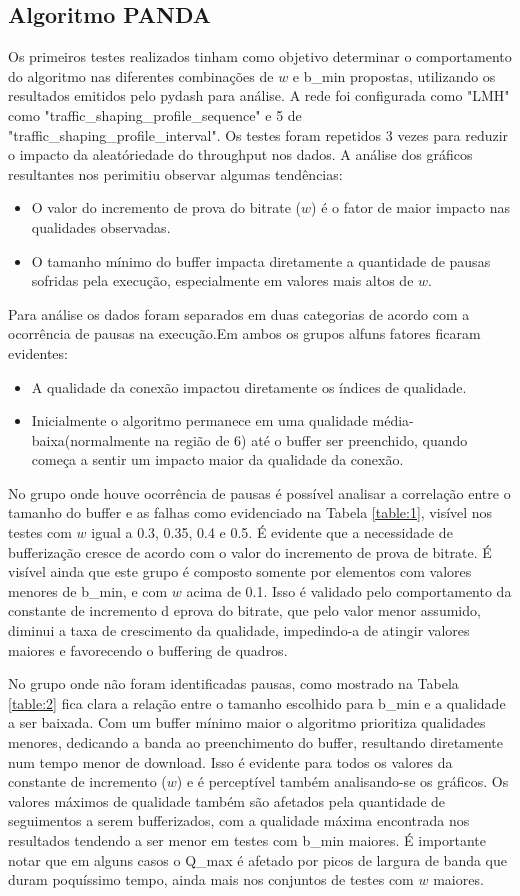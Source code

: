 \documentclass[10pt,twocolumn,letterpaper]{article}
\begin{document}
\subsection{Algoritmo PANDA}
Os primeiros testes realizados tinham como objetivo determinar o comportamento do algoritmo nas diferentes combinações de $w$ e b\_min propostas, utilizando os resultados emitidos pelo pydash para análise. A rede foi configurada como "LMH" como "traffic\_shaping\_profile\_sequence" e 5 de "traffic\_shaping\_profile\_interval". Os testes foram repetidos 3 vezes para reduzir o impacto da aleatóriedade do throughput nos dados. A análise dos gráficos resultantes nos perimitiu observar algumas tendências: 
\begin{itemize}
	\item O valor do incremento de prova do bitrate ($w$) é o fator de maior impacto nas qualidades observadas. 
	\item O tamanho mínimo do buffer impacta diretamente a quantidade de pausas sofridas pela execução, especialmente em valores mais altos de $w$.
\end{itemize}
Para análise os dados foram separados em duas categorias de acordo com a ocorrência de pausas na execução.Em ambos os grupos alfuns fatores ficaram evidentes:
\begin{itemize}
	\item A qualidade da conexão impactou diretamente os índices de qualidade.
	\item Inicialmente o algoritmo permanece em uma qualidade média-baixa(normalmente na região de 6) até o buffer ser preenchido, quando começa a sentir um impacto maior da qualidade da conexão.
\end{itemize}

No grupo onde houve ocorrência de pausas é possível analisar a correlação entre o tamanho do buffer e as falhas como evidenciado na Tabela \ref{table:1}, visível nos testes com $w$ igual a 0.3, 0.35, 0.4 e  0.5. É evidente que a necessidade de bufferização cresce de acordo com o valor do incremento de prova de bitrate. É visível ainda que este grupo é composto somente por elementos com valores menores de b\_min, e com $w$ acima de 0.1. Isso é validado pelo comportamento da  
constante de incremento d eprova do bitrate, que pelo valor menor assumido, diminui a taxa de crescimento da qualidade, impedindo-a de atingir valores maiores e favorecendo o buffering de quadros.

No grupo onde não foram identificadas pausas, como mostrado na Tabela \ref{table:2} fica clara a relação entre o tamanho escolhido para b\_min e a qualidade a ser baixada. Com um buffer mínimo maior o algoritmo prioritiza qualidades menores, dedicando a banda ao preenchimento do buffer, resultando diretamente num tempo menor de download. Isso é evidente para todos os valores da constante de incremento ($w$) e é perceptível também analisando-se os gráficos. Os valores máximos de qualidade também são afetados pela quantidade de seguimentos a serem bufferizados, com a qualidade máxima encontrada nos resultados tendendo a ser menor em testes com b\_min maiores. É importante notar que em alguns casos o Q\_max é afetado por picos de largura de banda que duram poquíssimo tempo, ainda mais nos conjuntos de testes com $w$ maiores. 
\end{document}
